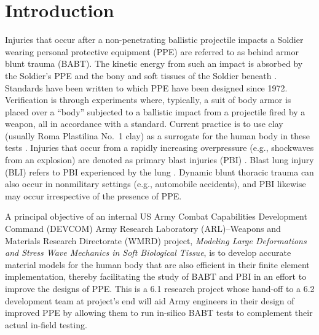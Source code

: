 \section{Introduction}
\label{partIntroduction}

Injuries that occur after a non-penetrating ballistic projectile impacts a Soldier wearing personal protective equipment (PPE) are referred to as behind armor blunt trauma (BABT).  The kinetic energy from such an impact is absorbed by the Soldier's PPE and the bony and soft tissues of the Soldier beneath \cite{Cannon01,grimal2004,cronin2015}.  Standards have been written to which PPE have been designed since 1972.  Verification is through experiments where, typically, a suit of body armor is placed over a ``body'' subjected to a ballistic impact from a projectile fired by a weapon, all in accordance with a standard.  Current practice is to use clay (usually Roma Plastilina No.~1 clay) as a surrogate for the human body in these tests \cite{HanlonGillich2012}.   Injuries that occur from a rapidly increasing overpressure (e.g., shockwaves from an explosion) are denoted as primary blast injuries (PBI) \cite{gibbons2015}.   Blast lung injury (BLI) refers to PBI experienced by the lung \cite{zhou2010}.  Dynamic blunt thoracic trauma can also occur in nonmilitary settings (e.g., automobile accidents), and PBI likewise may occur irrespective of the presence of PPE.

A principal objective of an internal US Army Combat Capabilities Development Command (DEVCOM) Army Research Laboratory (ARL)--Weapons and Materials Research Directorate (WMRD) project, \textit{Modeling Large Deformations and Stress Wave Mechanics in Soft Biological Tissue}, is to develop accurate material models for the human body that are also efficient in their finite element implementation, thereby facilitating the study of BABT and PBI in an effort to improve the designs of PPE.  This is a 6.1 research project whose hand-off to a 6.2 development team at project's end will aid Army engineers in their design of improved PPE by allowing them to run in-silico BABT tests to complement their actual in-field testing.

